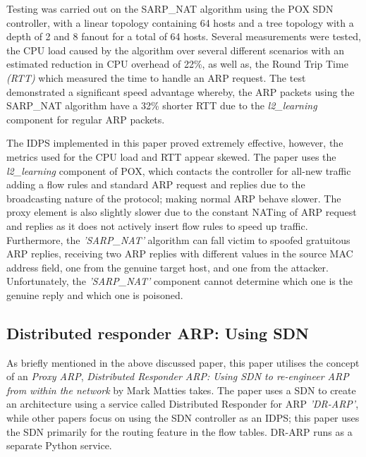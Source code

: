 \documentclass[12pt, oneside]{book}
\begin{document}
Testing was carried out on the SARP\_NAT algorithm using the POX SDN controller, with a linear topology containing 64 hosts and a tree topology
with a depth of 2 and 8 fanout for a total of 64 hosts. Several measurements were tested, the CPU load caused by the algorithm
over several different scenarios with an estimated reduction in CPU overhead of 22\%, as well as, the Round Trip Time \emph{(RTT)} which measured the time
to handle an ARP request. The test
demonstrated a significant speed advantage whereby, the ARP packets using the SARP\_NAT algorithm have a 32\% shorter RTT 
due to the \emph{l2\_learning} component for regular ARP packets.

The IDPS implemented in this paper proved extremely effective, however, the metrics used for the CPU load and RTT appear skewed.
The paper uses the \emph{l2\_learning} component of POX, which contacts the controller for all-new traffic adding a flow rules and
standard ARP request and replies due to the broadcasting nature of the protocol; making normal ARP behave slower.
The proxy element is also slightly slower due to the constant NATing of ARP request and replies as it does not actively insert flow
rules to speed up traffic.
Furthermore, the \emph{'SARP\_NAT'} algorithm can fall victim to spoofed gratuitous ARP replies,
receiving two ARP replies with different values in the source MAC address field,
one from the genuine target host, and one from the attacker. Unfortunately, the \emph{'SARP\_NAT'} component cannot determine
which one is the genuine reply and which one is poisoned.





\subsection{Distributed responder ARP: Using SDN}
\label{subsec:DistPaperLIT}
As briefly mentioned in the above discussed paper, this paper utilises the concept of an \emph{Proxy ARP},
\emph{Distributed Responder ARP: Using SDN to re-engineer ARP from within the network} by Mark Matties takes\cite{matties2017distributed}.
The paper uses a SDN to create an architecture using a service called Distributed Responder for ARP \emph{'DR-ARP'}, while other papers
focus on using the SDN controller as an IDPS; this paper uses the SDN primarily for the routing feature in the flow tables.
DR-ARP runs as a separate Python service.
\end{document}
